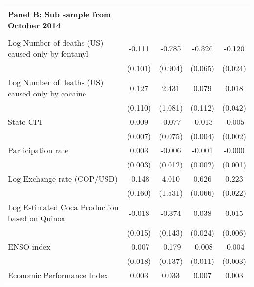 \begin{tabular}{lcccc}
 \hline   &  &  &  &  \\ \textbf{Panel B: Sub sample from October 2014} \\ & & & & \\
Log Number of deaths (US) caused only by fentanyl&      -0.111         &      -0.785         &      -0.326\sym{***}&      -0.120\sym{***}\\
                    &     (0.101)         &     (0.904)         &     (0.065)         &     (0.024)         \\
\addlinespace
Log Number of deaths (US) caused only by cocaine&       0.127         &       2.431\sym{*}  &       0.079         &       0.018         \\
                    &     (0.110)         &     (1.081)         &     (0.112)         &     (0.042)         \\
\addlinespace
State CPI           &       0.009         &      -0.077         &      -0.013\sym{**} &      -0.005\sym{**} \\
                    &     (0.007)         &     (0.075)         &     (0.004)         &     (0.002)         \\
\addlinespace
Participation rate  &       0.003         &      -0.006         &      -0.001         &      -0.000         \\
                    &     (0.003)         &     (0.012)         &     (0.002)         &     (0.001)         \\
\addlinespace
Log Exchange rate (COP/USD)&      -0.148         &       4.010\sym{**} &       0.626\sym{***}&       0.223\sym{***}\\
                    &     (0.160)         &     (1.531)         &     (0.066)         &     (0.022)         \\
\addlinespace
Log Estimated Coca Production based on Quinoa&      -0.018         &      -0.374\sym{**} &       0.038         &       0.015\sym{*}  \\
                    &     (0.015)         &     (0.143)         &     (0.024)         &     (0.006)         \\
\addlinespace
ENSO index          &      -0.007         &      -0.179         &      -0.008         &      -0.004         \\
                    &     (0.018)         &     (0.137)         &     (0.011)         &     (0.003)         \\
\addlinespace
Economic Performance Index&       0.003         &       0.033         &       0.007\sym{**} &       0.003\sym{***}\\

\end{tabular}
